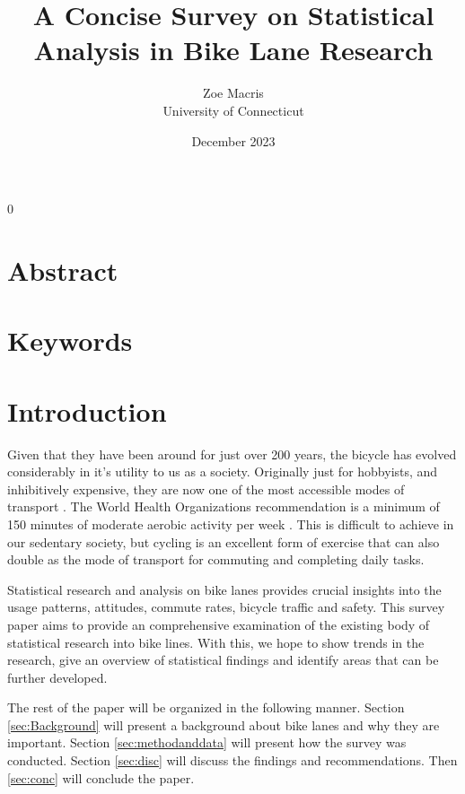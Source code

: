 \documentclass[12pt, letterpaper]{article}
\newcommand{\blind}{0}
\begin{document}

\blind
{
  \title{\bf A Concise Survey on Statistical Analysis in Bike Lane Research}
  \author{Zoe Macris\\
  University of Connecticut}
\date{December 2023}
  \maketitle} 


\section{Abstract}
\label{sec:abstract}



\section{Keywords}
\label{sec:keywords}


\section{Introduction}
\label{sec:intro}

Given that they have been around for just over 200 years, the bicycle has  evolved considerably in it's utility to us as a society. Originally just for hobbyists, and inhibitively expensive, they are now one of the most accessible modes of transport \cite{BIKE2023}. The World Health Organizations recommendation is a minimum of 150 minutes of moderate aerobic activity per week \citep{WHO2020}. This is difficult to achieve in our sedentary society, but cycling is an excellent form of exercise that can also double as the mode of transport for commuting and completing daily tasks. \par
Statistical research and analysis on bike lanes provides crucial insights into the usage patterns, attitudes, commute rates, bicycle traffic and safety. This survey paper aims to provide an comprehensive examination of the existing body of statistical research into bike lines. With this, we hope to show trends in the research, give an overview of statistical findings and identify areas that can be further developed. \par
The rest of the paper will be organized in the following manner. Section \ref{sec:Background} will present a background about bike lanes and why they are important. Section \ref{sec:methodanddata} will present how the survey was conducted. Section \ref{sec:disc} will discuss the findings and recommendations. Then \ref{sec:conc} will conclude the paper.
\end{document}
